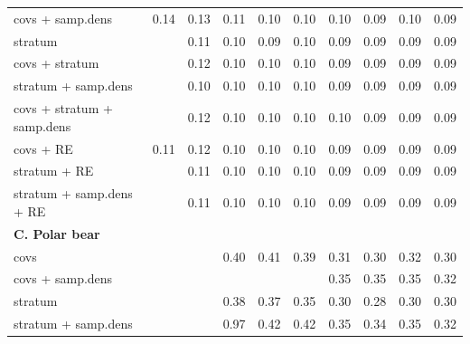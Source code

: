 \documentclass[]{rsos}%
\begin{document}
\begin{table}[ht]
\begin{tabular}{lrrrrrrrrr}
  covs + samp.dens & 0.14 & 0.13 & 0.11 & 0.10 & 0.10 & 0.10 & 0.09 & 0.10 & 0.09 \\
  stratum &  & 0.11 & 0.10 & 0.09 & 0.10 & 0.09 & 0.09 & 0.09 & 0.09 \\
  covs + stratum &  & 0.12 & 0.10 & 0.10 & 0.10 & 0.09 & 0.09 & 0.09 & 0.09 \\
  stratum + samp.dens &  & 0.10 & 0.10 & 0.10 & 0.10 & 0.09 & 0.09 & 0.09 & 0.09 \\
  covs + stratum + samp.dens &  & 0.12 & 0.10 & 0.10 & 0.10 & 0.10 & 0.09 & 0.09 & 0.09 \\
  covs + RE & 0.11 & 0.12 & 0.10 & 0.10 & 0.10 & 0.09 & 0.09 & 0.09 & 0.09 \\
  stratum + RE &  & 0.11 & 0.10 & 0.10 & 0.10 & 0.09 & 0.09 & 0.09 & 0.09 \\
  stratum + samp.dens + RE &  & 0.11 & 0.10 & 0.10 & 0.10 & 0.09 & 0.09 & 0.09 & 0.09 \\
  {\bf C. Polar bear} & & & & & & & & & \\
 covs &  &  & 0.40 & 0.41 & 0.39 & 0.31 & 0.30 & 0.32 & 0.30 \\
  covs + samp.dens &  &  &  &  &  & 0.35 & 0.35 & 0.35 & 0.32 \\
  stratum &  &  & 0.38 & 0.37 & 0.35 & 0.30 & 0.28 & 0.30 & 0.30 \\
  stratum + samp.dens &  &  & 0.97 & 0.42 & 0.42 & 0.35 & 0.34 & 0.35 & 0.32 \\
   \hline
\end{tabular}
\end{table}
\end{document}
